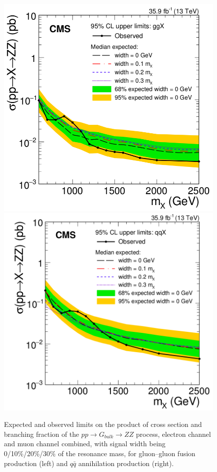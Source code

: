 \begin{figure}[htbp]
\begin{center}
\includegraphics[width=0.49\linewidth]{figures/sys_gglimits.png}
\includegraphics[width=0.49\linewidth]{figures/sys_qqlimits.png}
\caption{Expected and observed limits on the product of cross section and branching fraction of the $pp\rightarrow G_{bulk}\rightarrow ZZ$ process, electron channel and muon channel combined, with signal width being 0/10\%/20\%/30\% of the resonance mass, for gluon–gluon fusion production (left) and $q\bar{q}$ annihilation production (right).}
\label{fig:sys_ggqqlimits}
\end{center}
\end{figure}

